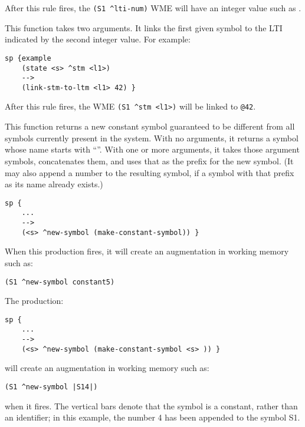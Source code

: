 \begin{description}
After this rule fires, the \verb|(S1 ^lti-num)| WME will have an integer value such as .


\item [\soarb{link-stm-to-ltm} --- ] This function takes two arguments. 
It links the first given symbol to the LTI indicated by the second integer value.
For example:

\begin{verbatim}
sp {example
    (state <s> ^stm <l1>)
    -->
    (link-stm-to-ltm <l1> 42) }
\end{verbatim}

After this rule fires, the WME \verb=(S1 ^stm <l1>)= will be linked to \verb=@42=.


\item [\soarb{make-constant-symbol} --- ] This function returns a new constant 
symbol
guaranteed to be different from all symbols currently present in the
system.  With no arguments, it returns a symbol whose name starts with
``''.  With one or more arguments, it takes those
argument symbols, concatenates them, and uses that as the
prefix for the new symbol. (It may also append a number to the 
resulting symbol, 
if a symbol with that prefix as its name already exists.)

\begin{verbatim}
sp {
    ...
    -->
    (<s> ^new-symbol (make-constant-symbol)) }
\end{verbatim}

When this production fires, it will create an augmentation in working
memory such as:

\begin{verbatim}
(S1 ^new-symbol constant5)
\end{verbatim} \vspace{12pt}

The production:

\begin{verbatim}
sp {
    ...
    -->
    (<s> ^new-symbol (make-constant-symbol <s> )) }
\end{verbatim}

will create an augmentation in working memory such as:
\begin{verbatim}
(S1 ^new-symbol |S14|)
\end{verbatim}

when it fires. The vertical bars denote that the symbol is a
constant, rather than an identifier; in this example, the number 4 has
been appended to the symbol S1.


\end{description}
